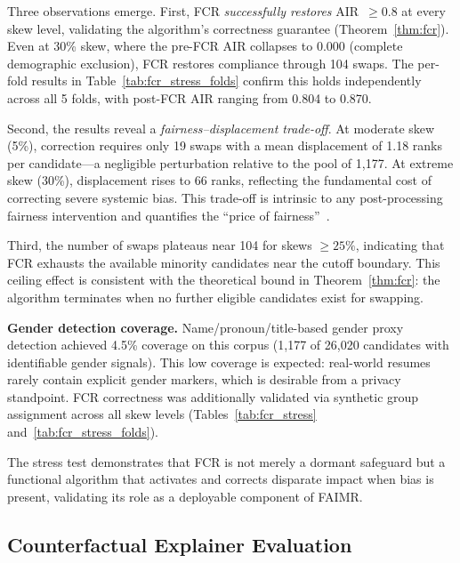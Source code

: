 \documentclass[smallcondensed,numbers]{sn-jnl}
\begin{document}
Three observations emerge. First, FCR \textit{successfully restores} AIR~$\geq 0.8$ at every skew level, validating the algorithm's correctness guarantee (Theorem~\ref{thm:fcr}). Even at 30\% skew, where the pre-FCR AIR collapses to $0.000$ (complete demographic exclusion), FCR restores compliance through 104 swaps. The per-fold results in Table~\ref{tab:fcr_stress_folds} confirm this holds independently across all 5 folds, with post-FCR AIR ranging from 0.804 to 0.870.

Second, the results reveal a \textit{fairness--displacement trade-off}. At moderate skew (5\%), correction requires only 19 swaps with a mean displacement of 1.18 ranks per candidate---a negligible perturbation relative to the pool of 1,177. At extreme skew (30\%), displacement rises to 66 ranks, reflecting the fundamental cost of correcting severe systemic bias. This trade-off is intrinsic to any post-processing fairness intervention and quantifies the ``price of fairness''~\cite{dwork2012fairness}.

Third, the number of swaps plateaus near 104 for skews $\geq 25\%$, indicating that FCR exhausts the available minority candidates near the cutoff boundary. This ceiling effect is consistent with the theoretical bound in Theorem~\ref{thm:fcr}: the algorithm terminates when no further eligible candidates exist for swapping.

\textbf{Gender detection coverage.} Name/pronoun/title-based gender proxy detection achieved 4.5\% coverage on this corpus (1,177 of 26,020 candidates with identifiable gender signals). This low coverage is expected: real-world resumes rarely contain explicit gender markers, which is desirable from a privacy standpoint. FCR correctness was additionally validated via synthetic group assignment across all skew levels (Tables~\ref{tab:fcr_stress} and~\ref{tab:fcr_stress_folds}).

The stress test demonstrates that FCR is not merely a dormant safeguard but a functional algorithm that activates and corrects disparate impact when bias is present, validating its role as a deployable component of FAIMR.

\subsection{Counterfactual Explainer Evaluation}
\end{document}

